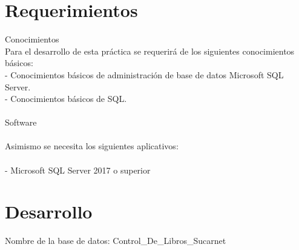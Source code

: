 \documentclass[12pt,letterpaper]{article}
\begin{document}
\section{Requerimientos}
Conocimientos
\\Para el desarrollo de esta práctica se requerirá de los siguientes conocimientos básicos:
\\- Conocimientos básicos de administración de base de datos Microsoft SQL Server.
\\- Conocimientos básicos de SQL.
\\\\Software
\\\\Asimismo se necesita los siguientes aplicativos:
\\\\- Microsoft SQL Server 2017 o superior

\section{Desarrollo}
Nombre de la base de datos: Control\_De\_Libros\_Sucarnet
\end{document}

